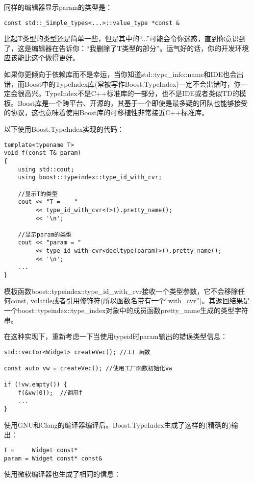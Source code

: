 同样的编辑器显示param的类型是：

\begin{lstlisting}
const std::_Simple_types<...>::value_type *const &
\end{lstlisting}

比起T类型的类型还是简单一些，但是其中的“...”可能会令你迷惑，直到你意识到了，这是编辑器在告诉你：“我删除了T类型的部分”。运气好的话，你的开发环境应该能比这个做得更好。

如果你更倾向于依赖库而不是幸运，当你知道std::type\_info::name和IDE也会出错，而Boost中的TypeIndex库(常被写作Boost.TypeIndex)一定不会出错时，你一定会很高兴。TypeIndex不是C++标准库的一部分，也不是IDE或者类似TD的模板。Boost库是一个跨平台、开源的，其基于一个即使是最多疑的团队也能够接受的协议，这也意味着使用Boost库的可移植性非常接近C++标准库。

以下使用Boost.TypeIndex实现的代码：

\begin{lstlisting}
template<typename T>
void f(const T& param)
{
	using std::cout;
	using boost::typeindex::type_id_with_cvr;
	
	//显示T的类型
	cout << "T = 	"
	     << type_id_with_cvr<T>().pretty_name();
	     << '\n';
	
	//显示param的类型
	cout << "param = "
	     << type_id_with_cvr<decltype(param)>().pretty_name();
	     << '\n';
	...
}
\end{lstlisting}

模板函数boost::typeindex::type\_id\_with\_cvr接收一个类型参数，它不会移除任何const, volatile或者引用修饰符(所以函数名带有一个“with\_cvr”)。其返回结果是一个boost::typeindex::type\_index对象中的成员函数pretty\_name生成的类型字符串。

在这种实现下，重新考虑一下当使用typeid时param输出的错误类型信息：

\begin{lstlisting}
std::vector<Widget> createVec(); //工厂函数

const auto vw = createVec(); //使用工厂函数初始化vw

if (!vw.empty()) {
	f(&vw[0]);	//调用f
	...
}
\end{lstlisting}

使用GNU和Clang的编译器编译后。Boost.TypeIndex生成了这样的(精确的)输出：

\begin{lstlisting}
T =		Widget const*
param =	Widget const* const& 
\end{lstlisting}

使用微软编译器也生成了相同的信息：

